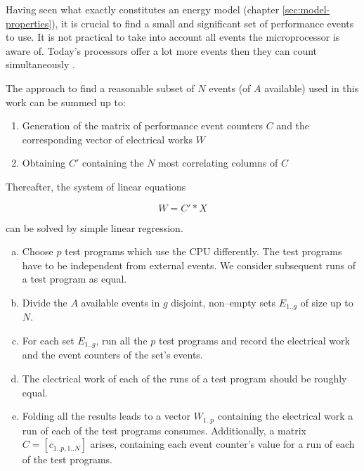 \label{sec:min-events}

Having seen  what exactly constitutes an energy model (chapter
\ref{sec:model-properties}), it is crucial to find a small and significant set
of performance events to use. It is not practical to take into account all
events the microprocessor is aware of. Today's processors offer a lot more
events then they can count simultaneously \cite{intel2011softdev1}.

The approach to find a reasonable subset of $N$ events (of $A$ available) used
in this work can be summed up to:

\begin{enumerate}

\item Generation of the matrix of performance event counters $C$ and
the corresponding vector of electrical works $W$

\item Obtaining $C'$ containing the $N$ most correlating columns of $C$

\end{enumerate}

Thereafter, the system of linear equations

\begin{equation}
W = C' * X
\end{equation}

can be solved by simple linear regression.



\begin{enumerate}[(a)]

\item Choose $p$ test programs which use the CPU differently. The test
programs have to be independent from external events. We consider subsequent
runs of a test program as equal.

\item Divide the $A$ available events in $g$ disjoint, non--empty sets
$E_{1..g}$ of size up to $N$.

\item For each set $E_{1..g}$, run all the $p$ test programs and record the
electrical work and the event counters of the set's events.

\item The electrical work of each of the runs of a test program should be
roughly equal.

\item Folding all the results leads to a vector $W_{1..p}$ containing the
electrical work a run of each of the test programs consumes. Additionally, a
matrix $C = [c_{1..p,1..N}]$ arises, containing each event counter's value for a
run of each of the test programs.

\end{enumerate}

